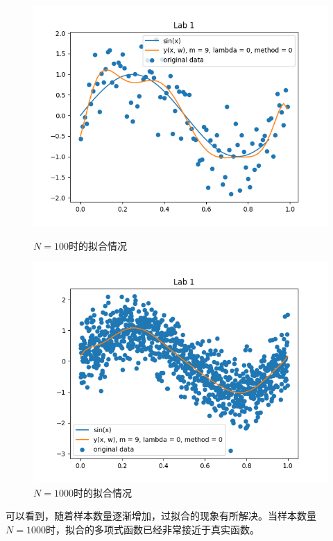 \begin{figure}[htbp]
    \begin{minipage}[t]{0.5\linewidth}
        \centering
        \includegraphics[width=\textwidth]{figures/Figure_7.png}
        \caption{$N = 100$时的拟合情况}
        \label{N100}
    \end{minipage}
    \begin{minipage}[t]{0.5\linewidth}
        \centering
        \includegraphics[width=\textwidth]{figures/Figure_8.png}
        \caption{$N = 1000$时的拟合情况}
        \label{N1000}
    \end{minipage}
\end{figure}

可以看到，随着样本数量逐渐增加，过拟合的现象有所解决。当样本数量$N = 1000$时，拟合的多项式函数已经非常接近于真实函数。

